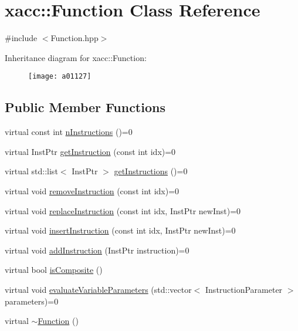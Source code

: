 \hypertarget{a01127}{}\section{xacc\+:\+:Function Class Reference}
\label{a01127}


{\ttfamily \#include $<$Function.\+hpp$>$}

Inheritance diagram for xacc\+:\+:Function\+:\begin{figure}[H]
\begin{center}
\leavevmode
\texttt{[image: a01127]}
\end{center}
\end{figure}
\subsection*{Public Member Functions}
\begin{DoxyCompactItemize}
\item 
virtual const int \hyperlink{a01127_a8901985525f59713e14c61713e07c086}{n\+Instructions} ()=0
\item 
virtual Inst\+Ptr \hyperlink{a01127_afa549fc91b5a05f26d8139954a7e0ed5}{get\+Instruction} (const int idx)=0
\item 
virtual std\+::list$<$ Inst\+Ptr $>$ \hyperlink{a01127_aaf80bd3d49113a92b520785572663032}{get\+Instructions} ()=0
\item 
virtual void \hyperlink{a01127_ab6478b09bb28e194bb555b3180737733}{remove\+Instruction} (const int idx)=0
\item 
virtual void \hyperlink{a01127_a2ef6a4923a6734f90f6ee3d94d263af0}{replace\+Instruction} (const int idx, Inst\+Ptr new\+Inst)=0
\item 
virtual void \hyperlink{a01127_acde702e44bdbc2759b338365218d7ebe}{insert\+Instruction} (const int idx, Inst\+Ptr new\+Inst)=0
\item 
virtual void \hyperlink{a01127_aa8c9ec2d08be75c69399d4254b0216f5}{add\+Instruction} (Inst\+Ptr instruction)=0
\item 
virtual bool \hyperlink{a01127_aa75500c657b5c3e0e36213e1506aad97}{is\+Composite} ()
\item 
virtual void \hyperlink{a01127_af6ae9453027789a2aaec30e59c9e45e3}{evaluate\+Variable\+Parameters} (std\+::vector$<$ Instruction\+Parameter $>$ parameters)=0
\item 
virtual \hyperlink{a01127_a04b25ba4da1ddfa4ec4ec6d6ffb25bc3}{$\sim$\+Function} ()
\end{DoxyCompactItemize}
